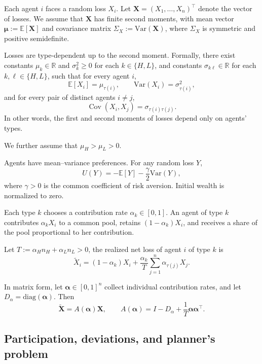 \documentclass[a4paper,12pt]{article}
\theoremstyle{definition}
\theoremstyle{remark}
\DeclareMathOperator{\Cov}{Cov}
\newcommand{\E}{\mathbb{E}}
\newcommand{\Var}{\mathrm{Var}}
\newcommand{\1}{\mathbf{1}}
\begin{document}
Each agent \(i\) faces a random loss \(X_i\). Let
$\mathbf X=(X_1,\dots,X_n)^\top$
denote the vector of losses. We assume that \(\mathbf X\) has finite second moments, with mean vector
$\boldsymbol{\mu}:=\E[\mathbf X]$
and covariance matrix
$\Sigma_X:=\Var(\mathbf X)$,
where \(\Sigma_X\) is symmetric and positive semidefinite.

Losses are type-dependent up to the second moment. Formally, there exist constants $\mu_k\in\mathbb{R}$ and $\sigma_k^2\ge 0$ for each $k\in\{H,L\}$, and constants $\sigma_{k\ell}\in\mathbb{R}$ for each $k,\ell\in\{H,L\}$, such that for every agent $i$,
\[
\E[X_i]=\mu_{\tau(i)},
\qquad
\Var(X_i)=\sigma_{\tau(i)}^2,
\]
and for every pair of distinct agents $i\neq j$,
\[
\Cov(X_i,X_j)=\sigma_{\tau(i)\tau(j)}.
\]
In other words, the first and second moments of losses depend only on agents' types.

We further assume that \(\mu_H>\mu_L>0\).

Agents have mean--variance preferences. For any random loss \(Y\),
\begin{equation}\label{eq:utility-general}
U(Y)=-\E[Y]-\frac{\gamma}{2}\Var(Y),
\end{equation}
where \(\gamma>0\) is the common coefficient of risk aversion. Initial wealth is normalized to zero.

Each type \(k\) chooses a contribution rate \(\alpha_k\in[0,1]\). An agent of type \(k\) contributes \(\alpha_k X_i\) to a common pool, retains \((1-\alpha_k)X_i\), and receives a share of the pool proportional to her contribution.

Let \(T:=\alpha_H n_H+\alpha_L n_L>0\), the realized net loss of agent \(i\) of type \(k\) is
\begin{equation}\label{eq:netloss-general}
\tilde X_i
=
(1-\alpha_k)X_i
+
\frac{\alpha_k}{T}\sum_{j=1}^n \alpha_{\tau(j)}X_j.
\end{equation}

In matrix form, let \(\boldsymbol{\alpha}\in[0,1]^n\) collect individual contribution rates, and let \(D_\alpha=\mathrm{diag}(\boldsymbol{\alpha})\). Then
\[
\tilde{\mathbf X}
=
A(\boldsymbol{\alpha})\mathbf X,
\qquad
A(\boldsymbol{\alpha})
=
I-D_\alpha+\frac{1}{T}\boldsymbol{\alpha}\boldsymbol{\alpha}^\top.
\]

\subsection{Participation, deviations, and planner’s problem}
\end{document}
